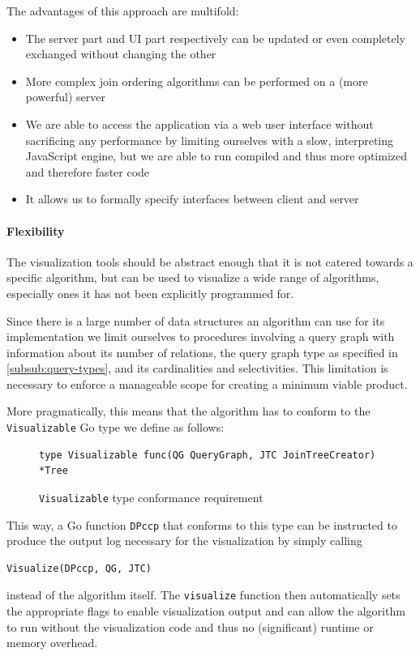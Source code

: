The advantages of this approach are multifold:
\begin{itemize}
    \item The server part and UI part respectively can be
          updated or even completely exchanged without 
          changing the other
    \item More complex join ordering algorithms can be 
          performed on a (more powerful) server
    \item We are able to access the application 
          via a web user interface without sacrificing 
          any performance by limiting ourselves with a 
          slow, interpreting JavaScript engine, but we are  
          able to run compiled and thus more optimized and therefore faster code
    \item It allows us to formally specify interfaces between
          client and server
\end{itemize}

\paragraph{Flexibility}
The visualization tools should be abstract enough that it is not catered towards a specific algorithm, but can be used to visualize a wide range of algorithms, especially ones it has not been explicitly programmed for.  

Since there is a large number of data structures an algorithm can use for its implementation we limit ourselves to procedures involving a query graph with information about its number of relations, the query graph type as specified in \ref{subsub:query-types}, and its cardinalities and selectivities.
This limitation is necessary to enforce a manageable scope for creating a minimum viable product.

More pragmatically, this means that the algorithm has to 
conform to the \texttt{Visualizable} Go type we define as 
follows:

\begin{figure}[H]
    \begin{verbatim}
type Visualizable func(QG QueryGraph, JTC JoinTreeCreator) *Tree
    \end{verbatim}
    \caption{\texttt{Visualizable} type conformance requirement}
    \centering
\label{fig:visalizable}
\end{figure}

\begin{example}
This way, a Go function \texttt{DPccp} that conforms to this type can be instructed to produce the output  log necessary for the visualization by simply calling 

\begin{verbatim}
Visualize(DPccp, QG, JTC)
\end{verbatim}
instead of the algorithm itself. The \texttt{visualize} function then automatically sets the appropriate flags to enable visualization output and can allow the algorithm to run without the visualization code and thus no (significant) runtime or memory overhead.

\end{example}

